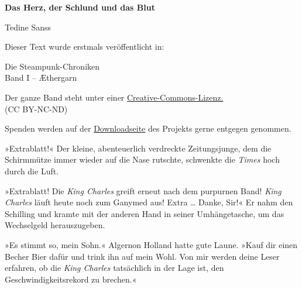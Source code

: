 \usepackage[ngerman]{babel}
\usepackage[T1]{fontenc}




\newcommand\bigpar\medskip


\raggedbottom
\begin{center}
\textbf{\huge\textsf{Das Herz, der Schlund und das Blut}}

\medskip
Tedine Sanss

\end{center}

\bigskip

\begin{flushleft}
Dieser Text wurde erstmals veröffentlicht in:
\begin{center}
Die Steampunk-Chroniken\\
Band I -- Æthergarn
\end{center}

\bigskip

Der ganze Band steht unter einer 
\href{http://creativecommons.org/licenses/by-nc-nd/2.0/de/}{Creative-Commons-Lizenz.} \\ 
(CC BY-NC-ND)

\bigskip

Spenden werden auf der 
\href{http://steampunk-chroniken.de/download}{Downloadseite}
des Projekts gerne entgegen genommen. 
\end{flushleft}

\newpage

»Extrablatt!« Der kleine, abenteuerlich verdreckte Zeitungsjunge,
dem die Schirmmütze immer wieder auf die Nase rutschte, schwenkte
die \textit{Times} hoch durch die Luft.

»Extrablatt! Die \textit{King Charles} greift erneut nach dem purpurnen
Band! \textit{King Charles} läuft heute noch zum Ganymed aus! Extra \ldots{}
Danke, Sir!« Er nahm den Schilling und kramte mit der anderen Hand
in seiner Umhängetasche, um das Wechselgeld herauszugeben.

\bigpar

»Es stimmt so, mein Sohn.« Algernon Holland hatte gute Laune. »Kauf
dir einen Becher Bier dafür und trink ihn auf mein Wohl. Von mir
werden deine Leser erfahren, ob die \textit{King Charles} tatsächlich in der
Lage ist, den Geschwindigkeitsrekord zu brechen.«

